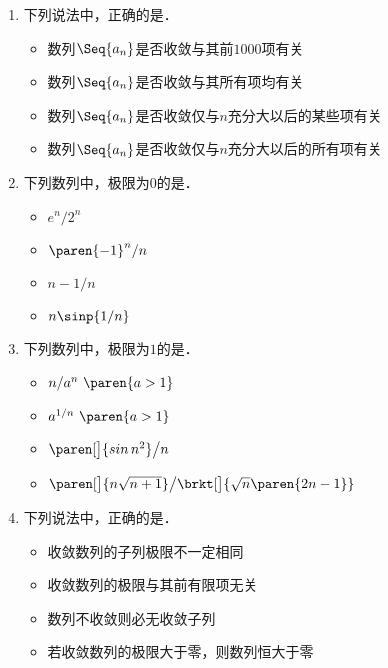 \documentclass[a4paper,punct=CCT]{ctexbook}
\theoremstyle{definition}
\theoremstyle{remark}
\newif\ifshowsol
\begin{document}
\begin{enumerate}
  \ifshowsol
  选项~B、C和~D都是题干的充分不必要条件．例如数列\(\Seq[\big]{A + \frac{1+(-1)^n}{2}}\)不收敛于\(A\)，但是不满足选项~B、C、D．实际上，选项~B和~D是等价的，然后选项~C是选项~B的充分不必要条件．
  \fi

\item 下列说法中，正确的是\uline{\makebox[10em]{}}．
  \begin{itemize}
    \renewcommand{\labelitemi}{\faCircleThin}
  \item 数列\(\Seq{a_n}\)是否收敛与其前\(1000\)项有关
  \item 数列\(\Seq{a_n}\)是否收敛与其所有项均有关
  \item 数列\(\Seq{a_n}\)是否收敛仅与\(n\)充分大以后的某些项有关
    \ifshowsol
  \item[\faCircle]
    \else
  \item
    \fi
    数列\(\Seq{a_n}\)是否收敛仅与\(n\)充分大以后的所有项有关
  \end{itemize}

\item 下列数列中，极限为\(0\)的是\uline{\makebox[6em]{}}．
  \begin{itemize}
    \renewcommand{\labelitemi}{\faCircleThin}
  \item \(e^n/2^n\)
    \ifshowsol
  \item[\faCircle]
    \else
  \item
    \fi
    \(\paren{-1}^n/n\)
  \item \(n - 1/n\)
  \item \(n \sinp{1/n}\)
  \end{itemize}

\item 下列数列中，极限为\(1\)的是\uline{\makebox[6em]{}}．
  \begin{itemize}
    \renewcommand{\labelitemi}{\faCircleThin}
  \item \(n/a^n\ \paren{a > 1}\)
    \ifshowsol
  \item[\faCircle]
    \else
  \item
    \fi
    \(a^{1/n}\ \paren{a > 1}\)
  \item \(\paren[\big]{\sin n^2}\big/{n}\)
  \item \(\paren[\big]{n \sqrt{n+1}}\big/\brkt[\big]{\sqrt n \paren{2n-1}}\)
  \end{itemize}

\item 下列说法中，正确的是\uline{\makebox[10em]{}}．
  \begin{itemize}
    \renewcommand{\labelitemi}{\faCircleThin}
  \item 收敛数列的子列极限不一定相同
    \ifshowsol
  \item[\faCircle]
    \else
  \item
    \fi
    收敛数列的极限与其前有限项无关
  \item 数列不收敛则必无收敛子列
  \item 若收敛数列的极限大于零，则数列恒大于零
  \end{itemize}


\end{enumerate}
\end{document}
